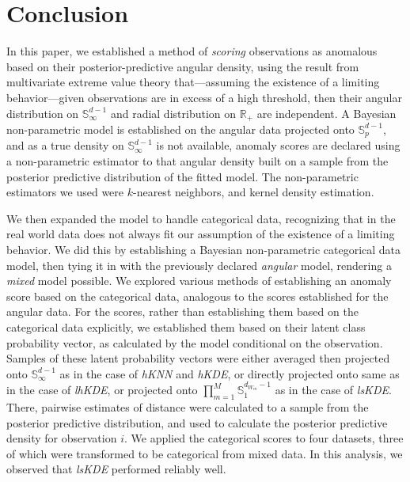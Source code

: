 \section{Conclusion\label{sec:conclusion}}
In this paper, we established a method of \emph{scoring} observations as 
    anomalous based on their posterior-predictive angular density, using the 
    result from multivariate extreme value theory that---assuming the existence 
    of a limiting behavior---given observations are in excess of a high 
    threshold, then their angular distribution on $\mathbb{S}_{\infty}^{d-1}$ 
    and radial distribution on $\mathbb{R}_+$ are independent. A Bayesian 
    non-parametric model is established on the angular data projected onto 
    $\mathbb{S}_p^{d-1}$, and as a true density on $\mathbb{S}_{\infty}^{d-1}$ 
    is not available, anomaly scores are declared using a non-parametric 
    estimator to that angular density built on a sample from the posterior 
    predictive distribution of the fitted model.  The non-parametric estimators 
    we used were $k$-nearest neighbors, and kernel density estimation.

We then expanded the model to handle categorical data, recognizing that in the 
    real world data does not always fit our assumption of the existence of a 
    limiting behavior.  We did this by establishing a Bayesian non-parametric 
    categorical data model, then tying it in with the previously declared 
    \emph{angular} model, rendering a \emph{mixed} model possible.  We explored 
    various methods of establishing an anomaly score based on the categorical 
    data, analogous to the scores established for the angular data.  For the 
    scores, rather than establishing them based on the categorical data 
    explicitly, we established them based on their latent class probability 
    vector, as calculated by the model conditional on the observation. Samples 
    of these latent probability vectors were either averaged then projected onto
    $\mathbb{S}_{\infty}^{d-1}$ as in the case of \emph{hKNN} and \emph{hKDE}, 
    or directly projected onto same as in the case of \emph{lhKDE}, or 
    projected onto    $\prod_{m = 1}^M\mathbb{S}_1^{d_{W_m}-1}$ as in the case 
    of \emph{lsKDE}.  There, pairwise estimates of distance were calculated to 
    a sample from the posterior predictive distribution, and used to calculate 
    the posterior predictive density for observation $i$. We applied the 
    categorical scores to four datasets, three of which were transformed to be 
    categorical from mixed data.  In this analysis, we observed that 
    \emph{lsKDE} performed reliably well.

